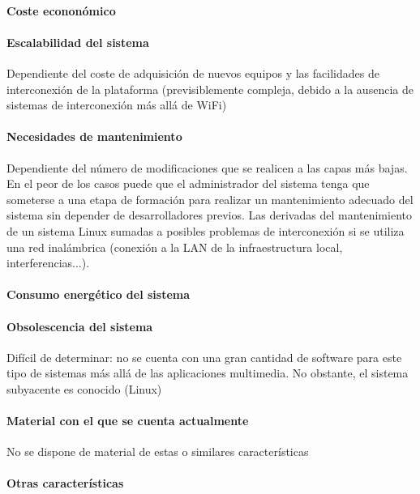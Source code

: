 \paragraph{Coste econonómico}



\paragraph{Escalabilidad del sistema}
Dependiente del coste de adquisición de nuevos equipos y las facilidades de interconexión de la plataforma (previsiblemente compleja, debido a la ausencia de sistemas de interconexión más allá de WiFi)

\paragraph{Necesidades de mantenimiento}

Dependiente del número de modificaciones que se realicen a las capas más bajas. En el peor de los casos puede que el administrador del sistema tenga que someterse a una etapa de formación para realizar un mantenimiento adecuado del sistema sin depender de desarrolladores previos.
Las derivadas del mantenimiento de un sistema Linux sumadas a posibles problemas de interconexión si se utiliza una red inalámbrica (conexión a  la LAN de la infraestructura local, interferencias...).

\paragraph{Consumo energético del sistema}



\paragraph{Obsolescencia del sistema}

Difícil de determinar: no se cuenta con una gran cantidad de software para este tipo de sistemas más allá de las aplicaciones multimedia. No obstante, el sistema subyacente es conocido (Linux)

\paragraph{Material con el que se cuenta actualmente}

No se dispone de material de estas o similares características

\paragraph{Otras características}

